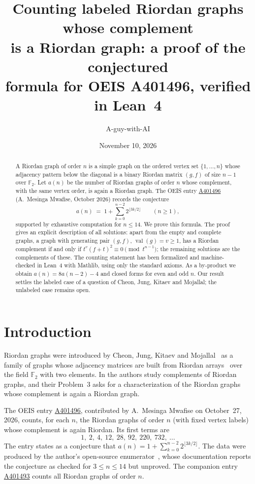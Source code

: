 \documentclass[11pt,a4paper]{amsart}
\title[Riordan graphs whose complement is Riordan]{Counting labeled Riordan graphs whose complement\\ is a Riordan graph: a proof of the conjectured\\ formula for OEIS A401496, verified in Lean~4}
\author{A-guy-with-AI}
\date{November 10, 2026}
\theoremstyle{definition}
\theoremstyle{remark}
\newcommand{\F}{\mathbb{F}_2}
\newcommand{\val}{\operatorname{val}}
\newcommand{\oeis}[1]{\href{https://oeis.org/#1}{#1}}
\begin{document}
\begin{abstract}
A Riordan graph of order $n$ is a simple graph on the ordered vertex set $\{1,\dots,n\}$ whose adjacency pattern below the diagonal is a binary Riordan matrix $(g,f)$ of size $n-1$ over $\F$. Let $a(n)$ be the number of Riordan graphs of order $n$ whose complement, with the same vertex order, is again a Riordan graph. The OEIS entry \oeis{A401496} (A.~Mesinga Mwafise, October 2026) records the conjecture
\[
  a(n) \;=\; 1+\sum_{k=0}^{n-2} 2^{\lfloor 3k/2\rfloor}\qquad(n\ge 1),
\]
supported by exhaustive computation for $n\le 14$. We prove this formula. The proof gives an explicit description of all solutions: apart from the empty and complete graphs, a graph with generating pair $(g,f)$, $\val(g)=v\ge 1$, has a Riordan complement if and only if $t^{v}(f+t)^2\equiv 0 \pmod{t^{n-1}}$; the remaining solutions are the complements of these. The counting statement has been formalized and machine-checked in Lean~4 with Mathlib, using only the standard axioms. As a by-product we obtain $a(n)=8a(n-2)-4$ and closed forms for even and odd $n$. Our result settles the labeled case of a question of Cheon, Jung, Kitaev and Mojallal; the unlabeled case remains open.
\end{abstract}

\maketitle

\section{Introduction}

Riordan graphs were introduced by Cheon, Jung, Kitaev and Mojallal~\cite{CJKM} as a family of graphs whose adjacency matrices are built from Riordan arrays~\cite{SGWW} over the field $\F$ with two elements. In \cite[Section~2.6]{CJKM} the authors study complements of Riordan graphs, and their Problem~3 asks for a characterization of the Riordan graphs whose complement is again a Riordan graph.

The OEIS entry \oeis{A401496}, contributed by A.~Mesinga Mwafise on October~27, 2026, counts, for each $n$, the Riordan graphs of order $n$ (with fixed vertex labels) whose complement is again Riordan. Its first terms are
\[
  1,\ 2,\ 4,\ 12,\ 28,\ 92,\ 220,\ 732,\ \dots
\]
The entry states as a conjecture that $a(n)=1+\sum_{k=0}^{n-2}2^{\lfloor 3k/2\rfloor}$. The data were produced by the author's open-source enumerator~\cite{MMsoft}, whose documentation reports the conjecture as checked for $3\le n\le 14$ but unproved. The companion entry \oeis{A401493} counts all Riordan graphs of order $n$.
\end{document}
